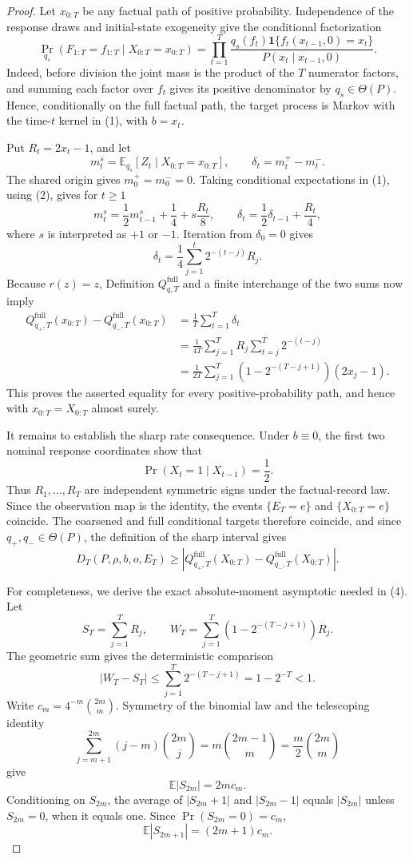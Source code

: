 \documentclass{article}
\begin{document}
\begin{proof}
Let \(x_{0:T}\) be any factual path of positive probability.  Independence of the response draws and initial-state exogeneity give the conditional factorization
\[
 \Pr_{q_s}(F_{1:T}=f_{1:T}\mid X_{0:T}=x_{0:T})
 =\prod_{t=1}^T
 \frac{q_s(f_t)\mathbf 1\{f_t(x_{t-1},0)=x_t\}}
 {P(x_t\mid x_{t-1},0)}.
 \tag{2}
\]
Indeed, before division the joint mass is the product of the \(T\) numerator factors, and summing each factor over \(f_t\) gives its positive denominator by \(q_s\in\Theta(P)\).  Hence, conditionally on the full factual path, the target process is Markov with the time-\(t\) kernel in (1), with \(b=x_t\).

Put \(R_t=2x_t-1\), and let
\[
 m_t^s=\mathbb E_{q_s}[Z_t\mid X_{0:T}=x_{0:T}],
 \qquad \delta_t=m_t^+-m_t^-.
\]
The shared origin gives \(m_0^+=m_0^-=0\).  Taking conditional expectations in (1), using (2), gives for \(t\ge1\)
\[
 m_t^s=\frac12m_{t-1}^s+\frac14+s\frac{R_t}{8},
 \qquad
 \delta_t=\frac12\delta_{t-1}+\frac{R_t}{4},
\]
where \(s\) is interpreted as \(+1\) or \(-1\).  Iteration from \(\delta_0=0\) gives
\[
 \delta_t=\frac14\sum_{j=1}^t2^{-(t-j)}R_j.
\]
Because \(r(z)=z\), Definition \(Q^{\mathrm{full}}_{q,T}\) and a finite interchange of the two sums now imply
\[
 \begin{aligned}
 Q^{\mathrm{full}}_{q_+,T}(x_{0:T})
 -Q^{\mathrm{full}}_{q_-,T}(x_{0:T})
 &=\frac1T\sum_{t=1}^T\delta_t\\
 &=\frac1{4T}\sum_{j=1}^TR_j\sum_{t=j}^T2^{-(t-j)}\\
 &=\frac1{2T}\sum_{j=1}^T
 \left(1-2^{-(T-j+1)}\right)(2x_j-1).
 \end{aligned}
 \tag{3}
\]
This proves the asserted equality for every positive-probability path, and hence with \(x_{0:T}=X_{0:T}\) almost surely.

It remains to establish the sharp rate consequence.  Under \(b\equiv0\), the first two nominal response coordinates show that
\[
 \Pr(X_t=1\mid X_{t-1})=\frac12.
\]
Thus \(R_1,\ldots,R_T\) are independent symmetric signs under the factual-record law.  Since the observation map is the identity, the events \(\{E_T=e\}\) and \(\{X_{0:T}=e\}\) coincide.  The coarsened and full conditional targets therefore coincide, and since \(q_+,q_-\in\Theta(P)\), the definition of the sharp interval gives
\[
 D_T(P,\rho,b,o,E_T)
 \ge
 \left|Q^{\mathrm{full}}_{q_+,T}(X_{0:T})
       -Q^{\mathrm{full}}_{q_-,T}(X_{0:T})\right|.
 \tag{4}
\]

For completeness, we derive the exact absolute-moment asymptotic needed in (4).  Let
\[
 S_T=\sum_{j=1}^TR_j,
 \qquad
 W_T=\sum_{j=1}^T\left(1-2^{-(T-j+1)}\right)R_j.
\]
The geometric sum gives the deterministic comparison
\[
 |W_T-S_T|
 \le\sum_{j=1}^T2^{-(T-j+1)}=1-2^{-T}<1.
 \tag{5}
\]
Write \(c_m=4^{-m}\binom{2m}{m}\).  Symmetry of the binomial law and the telescoping identity
\[
 \sum_{j=m+1}^{2m}(j-m)\binom{2m}{j}
 =m\binom{2m-1}{m}=\frac m2\binom{2m}{m}
\]
give
\[
 \mathbb E|S_{2m}|=2m c_m.
 \tag{6}
\]
Conditioning on \(S_{2m}\), the average of \(|S_{2m}+1|\) and \(|S_{2m}-1|\) equals \(|S_{2m}|\) unless \(S_{2m}=0\), when it equals one.  Since \(\Pr(S_{2m}=0)=c_m\),
\[
 \mathbb E|S_{2m+1}|=(2m+1)c_m.
 \tag{7}
\]


\end{proof}
\end{document}
